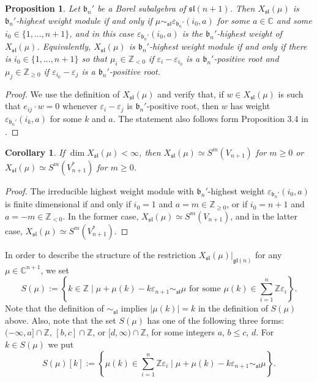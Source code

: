 \documentclass[12pt]{amsart}
\newcommand{\Z}{{\mathbb Z}}
\def\gb{\mathfrak{b}}
\def\gg{\mathfrak{g}}
\def\gl{\mathfrak{l}}
\def\Z{\mathbb{Z}}
\newtheorem{prop}[thm]{Proposition}
\newtheorem{cor}[thm]{Corollary}
\begin{document}
\begin{prop} \label{prop-sln-hw} Let $\gb_n'$ be a  Borel subalgebra of $\mathfrak{sl}({n+1})$.  Then $X_{\mathfrak{sl}}(\mu)$ is $\gb_n'$-highest weight module if and only if $\mu \sim_{\mathfrak{sl}} \varepsilon_{\gb_n'} (i_0,a)$ for some $a \in {\mathbb C}$ and some $i_0 \in \{1,...,n+1\}$,  and in this case $\varepsilon_{\gb_n'} (i_0,a)$ is the $\gb_n'$-highest weight of $X_{\mathfrak{sl}}(\mu)$. Equivalently, $X_{\mathfrak{sl}}(\mu)$ is $\gb_n'$-highest weight module if and only if there is $i_0 \in \{1,...,n+1\}$ so that $\mu_i \in \Z_{<0}$ if  $\varepsilon_i - \varepsilon_{i_0}$ is a $\gb_n'$-positive root and  $\mu_j \in \Z_{\geq 0}$ if $\varepsilon_{i_0} - \varepsilon_{j}$ is a $\gb_n'$-positive root.
\end{prop}
\begin{proof}
We use the definition of $X_{\mathfrak{sl}}(\mu)$ and verify that, if $w \in X_{\mathfrak{sl}}(\mu) $ is such that $e_{ij} \cdot w = 0$ whenever $\varepsilon_i - \varepsilon_{j}$ is $\gb_n'$-positive root, then $w$ has weight $\varepsilon_{\gb_n'} (i_k,a)$ for some $k$ and $a$. The statement also follows form Proposition 3.4 in \cite{BBL}.
\end{proof}

\begin{cor} \label{cor-sn-sln}
If $\dim X_{\mathfrak{sl}}(\mu)<\infty$, then $X_{\mathfrak{sl}}(\mu)\simeq S^m(V_{n+1})$ for $m\geq0$ or $X_{\mathfrak{sl}}(\mu)\simeq S^m(V^*_{n+1})$ for $m\geq 0$.
\end{cor}


\begin{proof} The irreducible highest weight module  with $\gb_n'$-highest weight $\varepsilon_{\gb_n'}(i_0,a)$    is finite dimensional if and only if $i_0=1$ and $a=m\in\mathbb{Z}_{\geq0}$, or if $i_0=n+1$ and $a=-m\in\mathbb{Z}_{<0}$. In the former case, $X_{\mathfrak{sl}}(\mu)\simeq S^m(V_{n+1})$, and in the latter case, $X_{\mathfrak{sl}}(\mu)\simeq S^m(V^*_{n+1})$.
\end{proof}

In order to describe the structure of the restriction $X_{\mathfrak{sl}}(\mu)|_{\gg \gl (n)}$ for any $\mu \in {\mathbb C}^{n+1}$, we set
$$
S(\mu) := \left\{ k \in {\mathbb Z} \; | \; \mu + \mu(k) - k\varepsilon_{n+1} \sim_{\mathfrak{sl}} \mu \mbox{ for some } \mu(k) \in \sum_{i=1}^n {\mathbb Z}\varepsilon_i \right\}.
$$
Note that the definition of $\sim_{\mathfrak{sl}} $ implies $|\mu(k)| = k$ in the definition of $S(\mu) $ above.  Also, note that the set $S(\mu)$ has one of the following three forms: $(-\infty, a] \cap {\mathbb Z}$, $[b,c] \cap {\mathbb Z}$, or $[d,\infty) \cap {\mathbb Z}$, for some integers $a$, $b\leq c$, $d$. For $k \in  S(\mu)$ we put 
$$
S(\mu)[k] := \left\{ \mu(k) \in \sum_{i=1}^n {\mathbb Z}\varepsilon_i  \; | \; \mu + \mu(k) - k\varepsilon_{n+1} \sim_{\mathfrak{sl}} \mu \right\}.
$$
\end{document}

